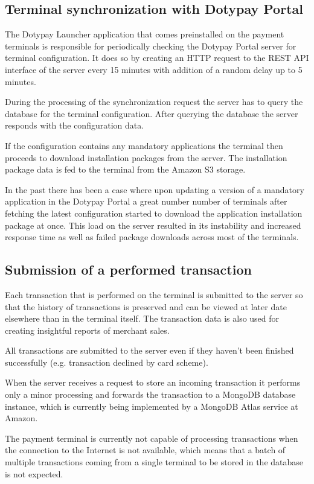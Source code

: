 \documentclass[12pt, a4paper]{article}
\begin{document}
\subsection{Terminal synchronization with Dotypay Portal}
The Dotypay Launcher application that comes preinstalled on the payment terminals is responsible for periodically checking the Dotypay Portal server for terminal configuration. It does so by creating an HTTP request to the REST API interface of the server every 15 minutes with addition of a random delay up to 5 minutes.

During the processing of the synchronization request the server has to query the database for the terminal configuration. After querying the database the server responds with the configuration data. 

If the configuration contains any mandatory applications the terminal then proceeds to download installation packages from the server. The installation package data is fed to the terminal from the Amazon S3 storage.

In the past there has been a case where upon updating a version of a mandatory application in the Dotypay Portal a great number number of terminals after fetching the latest configuration started to download the application installation package at once. 
This load on the server resulted in its instability and increased response time as well as failed package downloads across most of the terminals. 

\subsection{Submission of a performed transaction}
Each transaction that is performed on the terminal is submitted to the server so that the history of transactions is preserved and can be viewed at later date elsewhere than in the terminal itself.
The transaction data is also used for creating insightful reports of merchant sales.

All transactions are submitted to the server even if they haven't been finished successfully (e.g. transaction declined by card scheme).

When the server receives a request to store an incoming transaction it performs only a minor processing and forwards the transaction to a MongoDB database instance, which is currently being implemented by a MongoDB Atlas service at Amazon.

The payment terminal is currently not capable of processing transactions when the connection to the Internet is not available, which means that a batch of multiple transactions coming from a single terminal to be stored in the database is not expected. 
\end{document}

